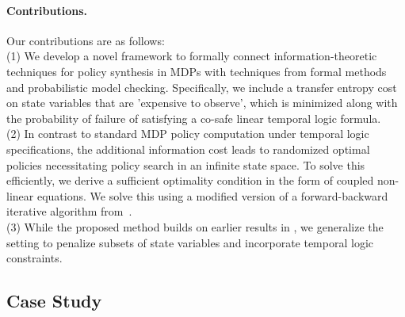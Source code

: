 

\paragraph*{\textbf{Contributions.}} Our contributions are as follows:\\
(1) We develop a novel framework to formally connect information-theoretic techniques for policy synthesis in MDPs with techniques from formal methods and probabilistic model checking. Specifically, we include a transfer entropy cost on state variables that are 'expensive to observe', which is  minimized along with the probability of failure of satisfying a co-safe linear temporal logic formula. \\
(2) In contrast to standard MDP policy computation under temporal logic specifications, the additional information cost leads to randomized optimal policies \cite{tanaka2017lqg,Todorov09,takashi17} necessitating policy search in an infinite state space. To solve this efficiently, we derive a sufficient optimality condition in the form of coupled non-linear equations. We solve this using a modified version of a forward-backward iterative algorithm from~\cite{Blahut72}.\\
(3) While the proposed method builds on earlier results in \cite{takashi17}, we generalize the setting to penalize subsets of state variables and incorporate temporal logic constraints. 

\subsection{Case Study}\label{sec:casestudy}


